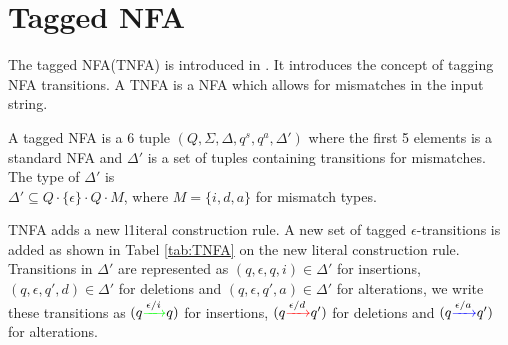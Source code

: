 \section{Tagged NFA}
\label{sec:tnfa}
The tagged NFA(TNFA) is introduced in \cite{Ville}. It introduces the concept of tagging NFA transitions. A TNFA is a NFA which allows for mismatches in the input string.

\begin{mydef}
A tagged NFA is a 6 tuple $(Q,\Sigma,\Delta,q^s,q^a,\Delta')$ where the first 5 elements is a standard NFA and $\Delta'$ is a set of tuples containing transitions for mismatches. The type of $\Delta'$ is \\$\Delta' \subseteq Q \cdot\{\epsilon\} \cdot Q \cdot M$, where $M = \{i,d,a\}$ for mismatch types.  
\end{mydef}
TNFA adds a new l1iteral construction rule. A new set of tagged $\epsilon$-transitions is added as shown in Tabel \ref{tab:TNFA} on the new literal construction rule. Transitions in $\Delta'$ are represented as $(q,\epsilon,q,i) \in \Delta'$ for insertions,$(q,\epsilon,q',d) \in \Delta'$ for deletions and $(q,\epsilon,q',a) \in \Delta'$ for alterations, we write these transitions as $(q {\color{green} \xrightarrow{{\color{black}\epsilon/i}}} q)$ for insertions, $(q {\color{red} \xrightarrow{{\color{black}\epsilon/d}}} q')$ for deletions and $(q {\color{blue} \xrightarrow{{\color{black}\epsilon/a}}} q')$ for alterations.
